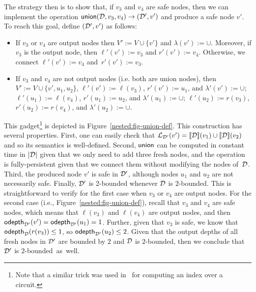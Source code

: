 The strategy then is to show that, if $v_3$ and $v_4$ are safe nodes, then we can implement the operation $\mathsf{union}(\mathcal{D},v_3, v_4) \rightarrow (\mathcal{D}',v')$ and produce a safe node $v'$. To reach this goal, define $(\mathcal{D}',v')$ as follows:
\begin{itemize}
	\item  If $v_3$ or $v_4$ are output nodes then $V' := V\cup\{v'\}$ and $\lambda(v') := \cup$. Moreover, if $v_3$ is the output node, then $\ell'(v') := v_3$ and $r'(v') := v_4$. Otherwise, we connect $\ell'(v') := v_4$ and~$r'(v') := v_3$.
	\item If $v_3$ and $v_4$ are not output nodes (i.e. both are union nodes), then $V' := V \cup\{v',u_1,u_2\}$, $\ell'(v') := \ell(v_3)$, $r'(v') := u_1$, and $\lambda'(v') := \cup$; $\ell'(u_1) := \ell(v_4)$, $r'(u_1) := u_2$, and $\lambda'(u_1) := \cup$; $\ell'(u_2) := r(v_3)$, $r'(u_2) := r(v_4)$, and $\lambda'(u_2) := \cup$.
\end{itemize}
This gadget\footnote{Note that a similar trick was used in~\cite{AmarilliBJM17} for computing an index over a circuit.} is depicted in Figure~\ref{nested:fig-union-def}. %
This construction has several properties.
First, one can easily check that $\mathcal{L}_{\mathcal{D}'}(v') = {\llbracket{\mathcal{D}}\rrbracket}(v_1)\cup{\llbracket{\mathcal{D}}\rrbracket}(v_2)$ and so its semantics is well-defined. 
Second, $\mathsf{union}$ can be computed in constant time in $|\mathcal{D}|$ given that we only need to add three fresh nodes, and the operation is fully-persistent given that we connect them without modifying the nodes of~$\mathcal{D}$. 
Third, the produced node $v'$ is safe in $\mathcal{D}'$, although nodes $u_1$ and $u_2$ are not necessarily safe. 
Finally, $\mathcal{D}'$ is 2-bounded whenever $\mathcal{D}$ is $2$-bounded. This is straightforward to verify for the first case when $v_3$ or $v_4$ are output nodes. For the second case (i.e., Figure~\ref{nested:fig-union-def}), recall that $v_3$ and $v_4$ are safe nodes, which means that $\ell(v_3)$ and $\ell(v_4)$ are output nodes, and then $\mathsf{odepth}_{\mathcal{D}'}(v') = \mathsf{odepth}_{\mathcal{D}'}(u_1) = 1$. Further, given that $v_3$ is safe, we know that $\mathsf{odepth}_{\mathcal{D}}(r(v_3)) \leq 1$, so $\mathsf{odepth}_{\mathcal{D}'}(u_2)\leq 2$. Given that the output depths of all fresh nodes in $\mathcal{D}'$ are bounded by $2$ and $\mathcal{D}$ is $2$-bounded, then we conclude that $\mathcal{D}'$ is $2$-bounded~as~well.

